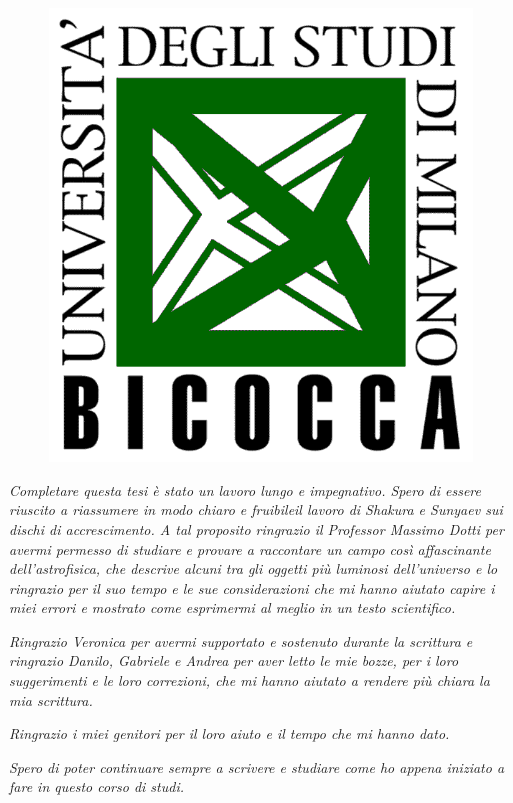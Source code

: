 \documentclass[a4paperbi]{article}
\begin{document}
\begin{titlepage}
	\begin{figure}[H]
		\centering
		\includegraphics[width=0.4\linewidth]{LogoBicocca}
		\label{fig:logobicocca}
	\end{figure} %
\vfill %
\end{titlepage}

\newpage
\clearpage\null

\newpage
\clearpage\null

\newpage
\vspace*{\fill}
\textit{Completare questa tesi è stato un lavoro lungo e impegnativo. Spero di essere riuscito a riassumere in modo chiaro e fruibileil lavoro di Shakura e Sunyaev sui dischi di accrescimento. A tal proposito ringrazio il Professor Massimo Dotti per avermi permesso di studiare e provare a raccontare un campo così affascinante dell'astrofisica, che descrive alcuni tra gli oggetti più luminosi dell'universo e lo ringrazio per il suo tempo e le sue considerazioni che mi hanno aiutato capire i miei errori e mostrato come esprimermi al meglio in un testo scientifico.}

\textit{Ringrazio Veronica per avermi supportato e sostenuto durante la scrittura e ringrazio Danilo, Gabriele e Andrea per aver letto le mie bozze, per i loro suggerimenti e le loro correzioni, che mi hanno aiutato a rendere più chiara la mia scrittura.}

\textit{Ringrazio i miei genitori per il loro aiuto e il tempo che mi hanno dato.}

\textit{Spero di poter continuare sempre a scrivere e studiare come ho appena iniziato a fare in questo corso di studi.}
\end{document}
